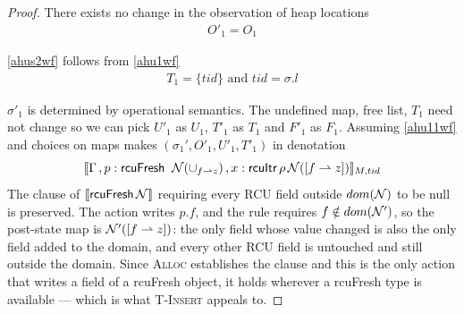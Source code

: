 \begin{proof}
There exists no change in the observation of heap locations
\begin{gather}\label{ahus1wf}
O'_1 =  O_1
\end{gather}

\ref{ahus2wf} follows from \ref{ahu1wf}
\begin{gather}\label{ahus2wf}
  T_1 = \{tid\} \text{ and } tid = \sigma.l
\end{gather}

$\sigma'_1$ is determined by operational semantics. The undefined map, free list, $T_1$ need not change so we can pick $U'_1$ as $U_1$, $T'_1$ as $T_1$ and $F'_1$ as $F_1$. Assuming \ref{ahu11wf} and choices on maps makes $(\sigma_1',O'_{1},U'_{1}, T'_{1})$ in denotation
\[\llbracket \Gamma \,, p : \textsf{rcuFresh} \;\; \mathcal{N}(\cup_{ f \rightharpoonup z}) \, , x:\textsf{rcuItr}\, \rho \, \mathcal{N}([f\rightharpoonup z]) \rrbracket_{M,tid}\]
The clause of $\llbracket \textsf{rcuFresh}\,\mathcal{N} \rrbracket$ requiring every
\textsf{RCU} field outside $dom(\mathcal{N})$ to be \textsf{null} is preserved.  The action
writes $p.f$, and the rule requires $f \notin dom(\mathcal{N}')$, so the post-state map is
$\mathcal{N}'([f\rightharpoonup z])$: the only field whose value changed is also the only
field added to the domain, and every other \textsf{RCU} field is untouched and
still outside the domain.  Since \textsc{Alloc} establishes the clause and this is
the only action that writes a field of a \textsf{rcuFresh} object, it holds
wherever a \textsf{rcuFresh} type is available --- which is what \textsc{T-Insert}
appeals to.


\end{proof}
